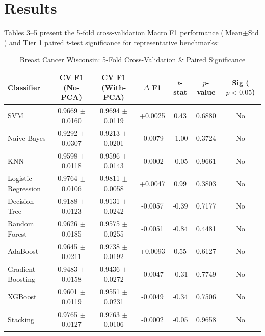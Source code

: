 \documentclass[12pt,a4paper]{article}
\begin{document}
\section{Results}
Tables 3--5 present the 5-fold cross-validation Macro F1 performance ($\text{Mean} \pm \text{Std}$) and Tier 1 paired $t$-test significance for representative benchmarks:

\begin{table}[H]
\centering
\footnotesize
\caption{Breast Cancer Wisconsin: 5-Fold Cross-Validation \& Paired Significance}
\begin{tabular}{lcccccc}
\toprule
\textbf{Classifier} & \textbf{CV F1 (No-PCA)} & \textbf{CV F1 (With-PCA)} & \textbf{$\Delta$ F1} & \textbf{$t$-stat} & \textbf{$p$-value} & \textbf{Sig ($p<0.05$)} \\
\midrule
SVM & 0.9669 $\pm$ 0.0160 & 0.9694 $\pm$ 0.0119 & +0.0025 & 0.43 & 0.6880 & No \\
Naive Bayes & 0.9292 $\pm$ 0.0307 & 0.9213 $\pm$ 0.0201 & -0.0079 & -1.00 & 0.3724 & No \\
KNN & 0.9598 $\pm$ 0.0118 & 0.9596 $\pm$ 0.0143 & -0.0002 & -0.05 & 0.9661 & No \\
Logistic Regression & 0.9764 $\pm$ 0.0106 & 0.9811 $\pm$ 0.0058 & +0.0047 & 0.99 & 0.3803 & No \\
Decision Tree & 0.9188 $\pm$ 0.0123 & 0.9131 $\pm$ 0.0242 & -0.0057 & -0.39 & 0.7177 & No \\
Random Forest & 0.9626 $\pm$ 0.0185 & 0.9575 $\pm$ 0.0255 & -0.0051 & -0.84 & 0.4481 & No \\
AdaBoost & 0.9645 $\pm$ 0.0211 & 0.9738 $\pm$ 0.0192 & +0.0093 & 0.55 & 0.6127 & No \\
Gradient Boosting & 0.9483 $\pm$ 0.0158 & 0.9436 $\pm$ 0.0272 & -0.0047 & -0.31 & 0.7749 & No \\
XGBoost & 0.9601 $\pm$ 0.0119 & 0.9551 $\pm$ 0.0231 & -0.0049 & -0.34 & 0.7506 & No \\
Stacking & 0.9765 $\pm$ 0.0127 & 0.9763 $\pm$ 0.0106 & -0.0002 & -0.05 & 0.9658 & No \\
\bottomrule
\end{tabular}
\end{table}
\end{document}
